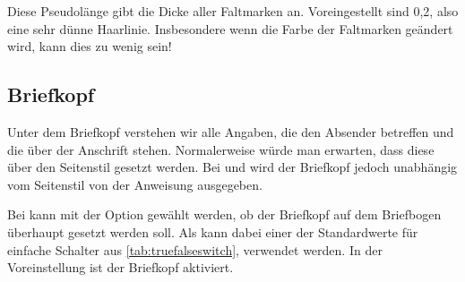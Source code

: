 \begin{Declaration}
\end{Declaration}
Diese Pseudolänge gibt die Dicke aller
Faltmarken an. Voreingestellt sind 0,2, also
eine sehr dünne Haarlinie. Insbesondere wenn die Farbe der Faltmarken
geändert wird, kann dies zu wenig sein!%
\EndIndexGroup
%
\EndIndexGroup


\subsection{Briefkopf}
\BeginIndexGroup
{}%

Unter dem Briefkopf verstehen wir alle Angaben, die den Absender betreffen und
die über der Anschrift stehen. Normalerweise würde man erwarten, dass diese
über den Seitenstil gesetzt werden. %
%
Bei  und  wird der
Briefkopf jedoch unabhängig vom Seitenstil von der Anweisung
 ausgegeben.

\begin{Declaration}
\end{Declaration}
\iffalse%
Das\ChangedAt{v2.97e}{\Class{scrlttr2}} oberste Element eines Briefbogens ist
normalerweise der Briefkopf. Bei
\else%
Bei
\fi%
\KOMAScript{} kann mit der Option
 gewählt werden, ob der Briefkopf auf dem Briefbogen
überhaupt gesetzt werden soll. Als  kann dabei einer der
Standardwerte für einfache Schalter aus \autoref{tab:truefalseswitch},
 verwendet werden. In der Voreinstellung ist
der Briefkopf aktiviert.%
%
\EndIndexGroup


